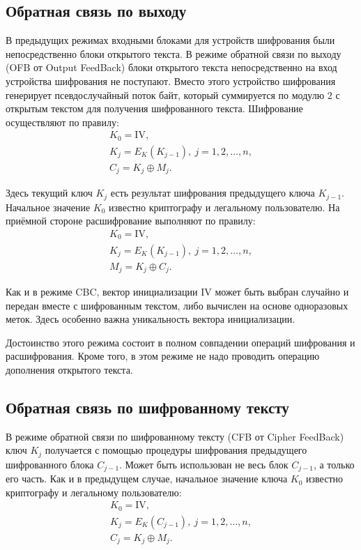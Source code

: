 \subsection{Обратная связь по выходу}

В предыдущих режимах входными блоками для устройств шифрования были непосредственно блоки открытого текста.
В режиме обратной связи по выходу (OFB от Output FeedBack) блоки открытого текста непосредственно на вход устройства шифрования не поступают. Вместо этого устройство шифрования генерирует псевдослучайный поток байт, который суммируется по модулю $2$ с открытым текстом для получения шифрованного текста. Шифрование осуществляют по правилу:
\[ \begin{array}{l}
    K_0 = \textrm{IV}, \\
    K_j = E_K(K_{j-1}), ~ j = 1, 2, \dots, n, \\
    C_j = K_j \oplus M_j.
\end{array} \]

Здесь текущий ключ $K_j$ есть результат шифрования предыдущего ключа $K_{j-1}$. Начальное значение $K_0$ известно криптографу и легальному пользователю. На приёмной стороне расшифрование выполняют по правилу:
\[ \begin{array}{l}
    K_0 = \textrm{IV}, \\
    K_j = E_K(K_{j-1}), ~ j = 1, 2, \dots, n, \\
    M_j = K_j \oplus C_j.
\end{array} \]

Как и в режиме CBC, вектор инициализации $\textrm{IV}$ может быть выбран случайно и передан вместе с шифрованным текстом, либо вычислен на основе одноразовых меток. Здесь особенно важна уникальность вектора инициализации.

Достоинство этого режима состоит в полном совпадении операций шифрования и расшифрования. Кроме того, в этом режиме не надо проводить операцию дополнения открытого текста.


\subsection{Обратная связь по шифрованному тексту}

В режиме обратной связи по шифрованному тексту (CFB от Cipher FeedBack) ключ $K_j$ получается с помощью процедуры шифрования предыдущего шифрованного блока $C_{j-1}$. Может быть использован не весь блок $C_{j-1}$, а только его часть. Как и в предыдущем случае, начальное значение ключа $K_0$ известно криптографу и легальному пользователю:
\[ \begin{array}{l}
    K_0 = \textrm{IV}, \\
    K_j = E_K(C_{j-1}), ~ j = 1, 2, \dots, n,\\
    C_j = K_j \oplus M_j.
\end{array} \]

